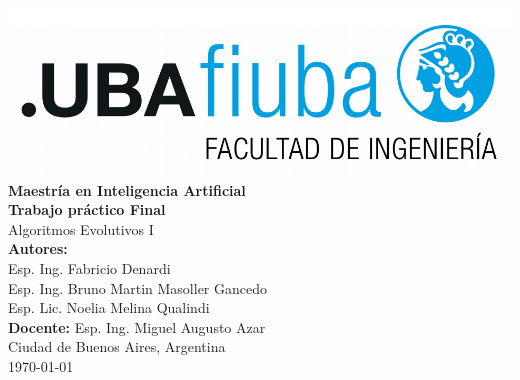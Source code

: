 \begin{titlepage}
    \centering
    \includegraphics[width=1\textwidth]{Figures/logoFIUBA.pdf}\\[2cm]

    {\Large \textbf{Maestría en Inteligencia Artificial}}\\[1cm]

    {\Huge \textbf{Trabajo práctico Final}}\\[0.5cm]
    {\Large Algoritmos Evolutivos I}\\[2cm]

    \textbf{Autores:}\\[0.3cm]
    Esp. Ing. Fabricio Denardi \\ 
    Esp. Ing. Bruno Martin	Masoller Gancedo \\
    Esp. Lic. Noelia Melina	Qualindi \\[1cm]
    
    \textbf{Docente:} Esp. Ing. Miguel Augusto	Azar \\[2cm]

    \vfill
    {\large Ciudad de Buenos Aires, Argentina \\[0.3cm]
    \today}
\end{titlepage}
